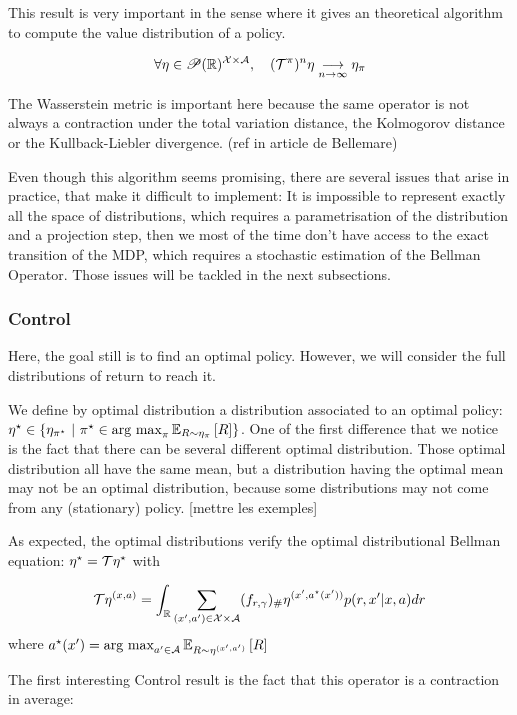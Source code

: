 This result is very important in the sense where it gives an theoretical algorithm to compute the value distribution of a policy.

\[ \forall \eta \in \mathscr{P}(\mathbb{R})^{\mathcal{X} \times \mathcal{A}}, \quad (\mathcal{T}^\pi )^n \eta \underset{n \rightarrow \infty}{\longrightarrow} \eta_\pi \]

The Wasserstein metric is important here because the same operator is not always a contraction under the total variation distance, the Kolmogorov distance or the Kullback-Liebler divergence. (ref in article de Bellemare)

Even though this algorithm seems promising, there are several issues that arise in practice, that make it difficult to implement: It is impossible to represent exactly all the space of distributions, which requires a parametrisation of the distribution and a projection step, then we most of the time don’t have access to the exact transition of the MDP, which requires a stochastic estimation of the Bellman Operator. Those issues will be tackled in the next subsections.

\subsubsection*{Control} 
Here, the goal still is to find an optimal policy. However, we will consider the full distributions of return to reach it.

We define by optimal distribution a distribution associated to an optimal policy: $\eta^{\star} \in \{ \eta_{\pi^{\star}} \ | \ \pi^{\star} \in \operatorname*{\mbox{arg max}}_{\pi} \mathbb{E}_{R \sim \eta_\pi}\left[ R \right]\}$.
One of the first difference that we notice is the fact that there can be several different optimal distribution. Those optimal distribution all have the same mean, but a distribution having the optimal mean may not be an optimal distribution, because some distributions may not come from any (stationary) policy. [mettre les exemples]
 

As expected, the optimal distributions verify the optimal distributional Bellman equation: $\eta^{\star} = \mathcal{T}\eta^{\star}$ with 

\[
    \mathcal{T}\eta^{(x,a)} = \int_{\mathbb{R}} \sum_{(x^\prime,a^\prime)\in \mathcal{X} \times \mathcal{A}} (f_{r,\gamma})_\#\eta^{(x^\prime,a^{\star}(x^\prime))}p(r,x^\prime|x,a)dr
\]
where $a^{\star}(x^\prime) = \operatorname*{\mbox{arg max}}_{a^\prime \in \mathcal{A}} \mathbb{E}_{R \sim \eta^{(x^\prime, a^\prime)}}\left[ R \right]$

The first interesting Control result is the fact that this operator is a contraction in average:

